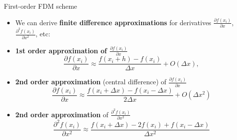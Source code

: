 %
%
\begin{frame}{First-order FDM scheme}
\begin{itemize}
\item We can derive \alert{\textbf{finite difference approximations}} for derivatives 
$\frac{\partial f(x_{i})}{\partial x}$, $\frac{\partial^{2}f(x_{i})}{\partial x^{2}}$, etc: 
%
\item {\bf 1st order approximation of $\frac{\partial f(x_{i})}{\partial x}$ }
\[
{\displaystyle \frac{\partial f(x_{i})}{\partial x}\approx\frac{f(x_{i}+h)-f(x_{i})}{\Delta x}} + O (\Delta x),
\]
%
\item {\bf 2nd order approximation} (central difference) of $\frac{\partial f(x_{i})}{\partial x}$ 
%
\[
\frac{\partial f(x_{i})}{\partial x}\approx\frac{f(x_{i}+\Delta x)-f(x_{i}-\Delta x)}{2\Delta x}+O(\Delta x^{2})
\]
%
\item {\bf 2nd order approximation} of $\frac{\partial^{2}f(x_{i})}{\partial x^{2}}$ 
%
\[
\frac{\partial^{2}f(x_{i})}{\partial x^{2}} \approx\frac{f(x_{i}+\Delta x)-2f(x_{i})+f(x_{i}-\Delta x)}{\Delta x^{2}}
\]
%
%
\end{itemize}
\end{frame}
%
